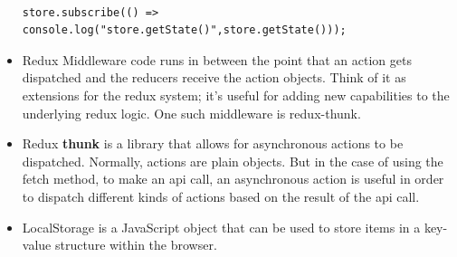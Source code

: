 \documentclass[8pt,a4paper]{extarticle}
\begin{document}
\begin{itemize}
\begin{verbatim}

store.subscribe(() => console.log("store.getState()",store.getState()));

\end{verbatim}

\item Redux Middleware code runs in between the point that an action gets dispatched and the reducers receive the action objects. Think of it as extensions for the redux system; it’s useful for adding new capabilities to the underlying redux logic. One such middleware is redux-thunk.

\item Redux \textbf{thunk} is a library that allows for asynchronous actions to be dispatched. Normally, actions are plain objects. But in the case of using the fetch method, to make an api call, an asynchronous action is useful in order to dispatch different kinds of actions based on the result of the api call.

\item LocalStorage is a JavaScript object that can be used to store items in a key-value structure within the browser.


\end{itemize}
\end{document}
